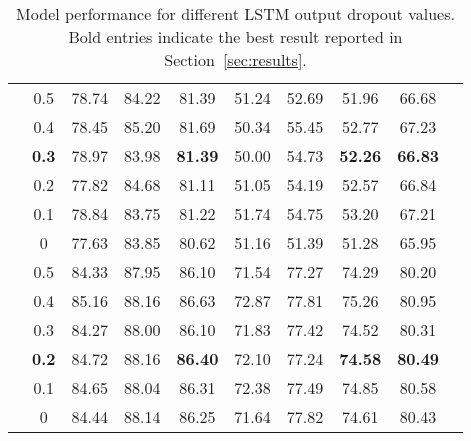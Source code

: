 \documentclass[review]{elsarticle}
\newcommand{\secref}[1]{Section~\ref{#1}}
\begin{document}
\begin{table}[htp]
{\begin{tabular}{@{\extracolsep{4pt}}cccccccccc@{}}
&0.5&78.74  &84.22 & 81.39 & 51.24 & 52.69 & 51.96 & 66.68 \\
&0.4 & 78.45 & 85.20 &81.69 & 50.34 & 55.45 & 52.77 & 67.23\\
&\textbf{0.3}  &78.97&  83.98       &\textbf{81.39}     &50.00&54.73&\textbf{52.26}& \textbf{66.83} \\
&0.2 &77.82& 84.68      &81.11    &51.05&54.19&52.57& 66.84  \\
& 0.1&  78.84 & 83.75 &81.22 & 51.74 & 54.75 & 53.20 & 67.21\\  
& 0&  77.63 & 83.85 & 80.62 & 51.16 & 51.39 & 51.28 & 65.95 
\\
 \midrule
\parbox[c]{5mm}{}

&0.5& 84.33 & 87.95 & 86.10   &71.54 & 77.27  & 74.29     &80.20
  \\
&0.4 &  85.16 & 88.16  & 86.63   & 72.87 &77.81  &75.26 &80.95
\\
&0.3  &84.27 & 88.00  &86.10    &71.83 &77.42&74.52 &80.31 \\
& \textbf{0.2}& 84.72 & 88.16  &\textbf{86.40}    &72.10 &77.24&\textbf{74.58} & \textbf{80.49} \\
& 0.1&84.65  &88.04  &86.31    &72.38 & 77.49 & 74.85   & 80.58\\ 
& 0&  84.44 & 88.14  & 86.25   &71.64 &77.82  & 74.61  & 80.43\\







     
\bottomrule
\end{tabular}
 }
\caption{Model performance for different LSTM output dropout values.
Bold entries indicate the best result reported in \secref{sec:results}.}
\label{tab:lstm_output_dropout}
 \end{table}
 
 
 
\end{document}
